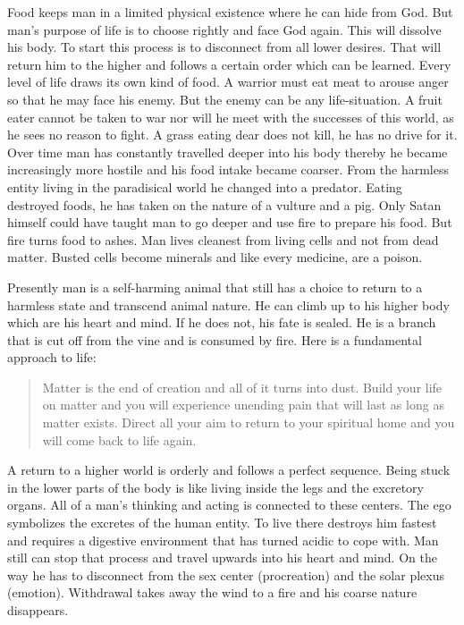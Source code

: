 \documentclass[12pt,letterpaper]{article}
\begin{document}
Food keeps man in a limited physical existence where he can hide from
God. But man's purpose of life is to choose rightly and face God
again. This will dissolve his body. To start this process is to
disconnect from all lower desires. That will return him to the higher
and follows a certain order which can be learned. Every level of life
draws its own kind of food. A warrior must eat meat to arouse anger so
that he may face his enemy. But the enemy can be any life-situation. A
fruit eater cannot be taken to war nor will he meet with the successes
of this world, as he sees no reason to fight. A grass eating dear does
not kill, he has no drive for it. Over time man has constantly
travelled deeper into his body thereby he became increasingly more
hostile and his food intake became coarser. From the harmless entity
living in the paradisical world he changed into a predator. Eating
destroyed foods, he has taken on the nature of a vulture and a
pig. Only Satan himself could have taught man to go deeper and use
fire to prepare his food. But fire turns food to ashes. Man lives
cleanest from living cells and not from dead matter. Busted cells
become minerals and like every medicine, are a poison.

Presently man is a self-harming animal that still has a choice to
return to a harmless state and transcend animal nature. He can climb
up to his higher body which are his heart and mind. If he does not,
his fate is sealed. He is a branch that is cut off from the vine and
is consumed by fire. Here is a fundamental approach to life:
\begin{quote} Matter is the end of creation and all of it turns into
dust. Build your life on matter and you will experience unending pain
that will last as long as matter exists. Direct all your aim to return
to your spiritual home and you will come back to life again.
\end{quote}

A return to a higher world is orderly and follows a perfect
sequence. Being stuck in the lower parts of the body is like living
inside the legs and the excretory organs. All of a man's thinking and
acting is connected to these centers. The ego symbolizes the excretes
of the human entity. To live there destroys him fastest and requires a
digestive environment that has turned acidic to cope with. Man still
can stop that process and travel upwards into his heart and mind. On
the way he has to disconnect from the sex center (procreation) and the
solar plexus (emotion). Withdrawal takes away the wind to a fire and
his coarse nature disappears.
\end{document}
